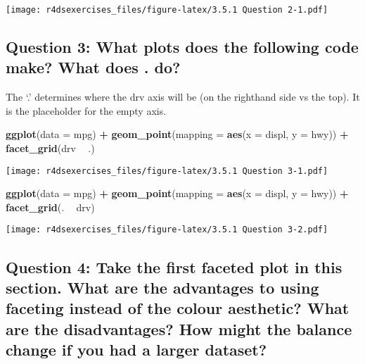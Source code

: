 \documentclass[
]{book}
\newenvironment{Shaded}{\begin{snugshade}}{\end{snugshade}}
\newcommand{\DataTypeTok}[1]{\textcolor[rgb]{0.13,0.29,0.53}{#1}}
\newcommand{\KeywordTok}[1]{\textcolor[rgb]{0.13,0.29,0.53}{\textbf{#1}}}
\newcommand{\NormalTok}[1]{#1}
\newcommand{\OperatorTok}[1]{\textcolor[rgb]{0.81,0.36,0.00}{\textbf{#1}}}
\newcommand{\StringTok}[1]{\textcolor[rgb]{0.31,0.60,0.02}{#1}}
\begin{document}
\texttt{[image: r4dsexercises\_files/figure-latex/3.5.1 Question 2-1.pdf]}

\hypertarget{question-3-what-plots-does-the-following-code-make-what-does-.-do}{%
\subsection{Question 3: What plots does the following code make? What does . do?}\label{question-3-what-plots-does-the-following-code-make-what-does-.-do}}

The `.' determines where the drv axis will be (on the righthand side vs the top). It is the placeholder for the empty axis.

\begin{Shaded}
\begin{Highlighting}[]
\KeywordTok{ggplot}\NormalTok{(}\DataTypeTok{data =}\NormalTok{ mpg) }\OperatorTok{+}\StringTok{ }
\StringTok{  }\KeywordTok{geom_point}\NormalTok{(}\DataTypeTok{mapping =} \KeywordTok{aes}\NormalTok{(}\DataTypeTok{x =}\NormalTok{ displ, }\DataTypeTok{y =}\NormalTok{ hwy)) }\OperatorTok{+}
\StringTok{  }\KeywordTok{facet_grid}\NormalTok{(drv }\OperatorTok{~}\StringTok{ }\NormalTok{.) }
\end{Highlighting}
\end{Shaded}

\texttt{[image: r4dsexercises\_files/figure-latex/3.5.1 Question 3-1.pdf]}

\begin{Shaded}
\begin{Highlighting}[]
\KeywordTok{ggplot}\NormalTok{(}\DataTypeTok{data =}\NormalTok{ mpg) }\OperatorTok{+}\StringTok{ }
\StringTok{  }\KeywordTok{geom_point}\NormalTok{(}\DataTypeTok{mapping =} \KeywordTok{aes}\NormalTok{(}\DataTypeTok{x =}\NormalTok{ displ, }\DataTypeTok{y =}\NormalTok{ hwy)) }\OperatorTok{+}
\StringTok{  }\KeywordTok{facet_grid}\NormalTok{(. }\OperatorTok{~}\StringTok{ }\NormalTok{drv) }
\end{Highlighting}
\end{Shaded}

\texttt{[image: r4dsexercises\_files/figure-latex/3.5.1 Question 3-2.pdf]}

\hypertarget{question-4-take-the-first-faceted-plot-in-this-section.-what-are-the-advantages-to-using-faceting-instead-of-the-colour-aesthetic-what-are-the-disadvantages-how-might-the-balance-change-if-you-had-a-larger-dataset}{%
\subsection{Question 4: Take the first faceted plot in this section. What are the advantages to using faceting instead of the colour aesthetic? What are the disadvantages? How might the balance change if you had a larger dataset?}\label{question-4-take-the-first-faceted-plot-in-this-section.-what-are-the-advantages-to-using-faceting-instead-of-the-colour-aesthetic-what-are-the-disadvantages-how-might-the-balance-change-if-you-had-a-larger-dataset}}
\end{document}
